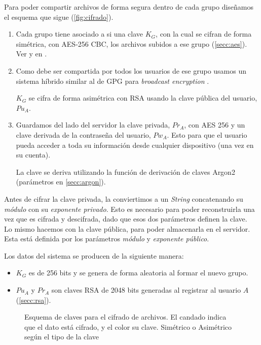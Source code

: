 Para poder compartir archivos de forma segura dentro de cada grupo diseñamos
el esquema que sigue (\autoref{fig:cifrado})\label{secc:esquemacifrado}.
\begin{enumerate}
	\item Cada grupo tiene asociado a si una clave \(K_G\), con la cual se
		cifran de forma simétrica, con AES-256 CBC, los archivos
		subidos a ese grupo (\autoref{secc:aes}).
		Ver  y 
		en .

	\item 	Como debe ser compartida por todos los usuarios de ese grupo
		usamos un sistema híbrido\autocite{ppt202} similar al de GPG
		para \emph{broadcast encryption} \autocite{gpgbroadcast}.

		\(K_G\) se cifra de forma asimétrica con RSA usando la clave
		pública del usuario, \(Pu_A\).

	\item Guardamos del lado del servidor la clave privada, \(Pr_A\), con
		AES 256 y un clave derivada de la contraseña del usuario,
		\(Pw_A\).
		Esto para que el usuario pueda acceder a toda su información
		desde cualquier dispositivo (una vez en su cuenta).

		La clave se deriva utilizando la función  de derivación de
		claves Argon2 (parámetros en \autoref{secc:argon}).
\end{enumerate}

Antes de cifrar la clave privada, la conviertimos a un \emph{String}
concatenando su \emph{módulo} con su \emph{exponente privado}.
Esto es necesario para poder reconstruirla una vez que es cifrada y
descifrada, dado que esos dos parámetros definen la clave.~\cite{rsa-prk}
Lo mismo hacemos con la clave pública, para poder almacenarla en el servidor.
Esta está definida por los parámetros \emph{módulo} y \emph{exponente público}.~\cite{rsa-puk}

Los datos del sistema se producen de la siguiente manera:

\begin{itemize}
	\item \(K_G\) es de 256 bits y se genera de forma aleatoria al formar
		el nuevo grupo.
	\item  \(Pu_A\) y  \(Pr_A\) son claves RSA de 2048 bits generadas al
		registrar al usuario \(A\) (\autoref{secc:rsa}).
\end{itemize}

\begin{figure}[H]
    \centering
    \caption{Esquema de claves para el cifrado de archivos.
	    El candado indica que el dato está cifrado, y el color su clave.
	    Simétrico o Asimétrico según el tipo de la clave}\label{fig:cifrado}
\end{figure}


